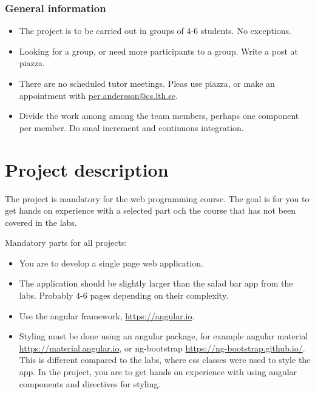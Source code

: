\documentclass[fleqn, article, a4paper]{memoir}
\begin{document}
\maketitle
\thispagestyle{titlepage}
\vspace{-4cm}

\subsubsection*{General information}

\begin{itemize}\firmlist
\item The project is to be carried out in groups of 4-6 students. No exceptions.
\item Looking for a group, or need more participants to a group. Write a post at piazza.
\item There are no scheduled tutor meetings. Pleas use piazza, or make an appointment with \url{per.andersson@cs.lth.se}.
\item Divide the work among among the team members, perhaps one component per member. Do smal increment and continuous integration.
\end{itemize}

\section*{Project description}
\n The project is mandatory for the web programming course. The goal is for you to get hands on experience with a selected part och the course that has not been covered in the labs.

\noindent Mandatory parts for all projects:
\begin{itemize}\firmlist
\item You are to develop a single page web application.
\item The application should be slightly larger than the salad bar app from the labs. Probably 4-6 pages depending on their complexity.
\item Use the angular framework, \url{https://angular.io}.
\item Styling must be done using an angular package, for example angular material \url{https://material.angular.io}, or ng-bootstrap \url{https://ng-bootstrap.github.io/}. This is different compared to the labs, where css classes were used to style the app. In the project, you are to get hands on experience with using angular components and directives for styling.
\end{itemize}
\end{document}
